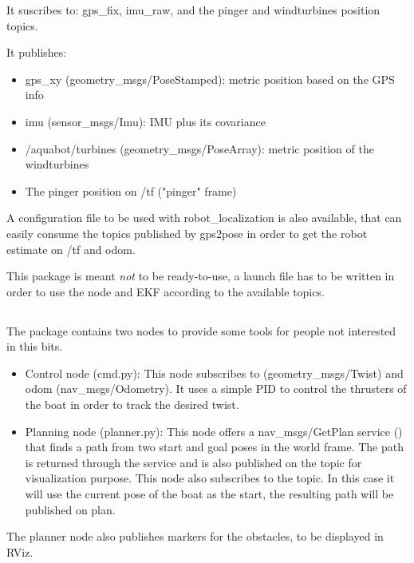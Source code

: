 \documentclass{ecnreport}
\begin{document}
It suscribes to: gps\_fix, imu\_raw, and the pinger and windturbines position topics.

It publishes:
\begin{itemize}
 \item gps\_xy (geometry\_msgs/PoseStamped): metric position based on the GPS info
\item imu (sensor\_msgs/Imu): IMU plus its covariance
\item /aquabot/turbines (geometry\_msgs/PoseArray): metric position of the windturbines
\item The pinger position on /tf ("pinger" frame)
\end{itemize}


A configuration file to be used with robot\_localization is also available, that can easily consume the topics published by gps2pose in order to get the robot estimate on /tf and odom.

This package is meant \emph{not} to be ready-to-use, a launch file has to be written in order to use the node and EKF according to the available topics.

\subsection{}

The  package contains two nodes to provide some tools for people not interested in this bits.

\begin{itemize}
 \item Control node (cmd.py): This node subscribes to  (geometry\_msgs/Twist) and odom (nav\_msgs/Odometry). It uses a simple PID to control the thrusters of the boat in order to track the desired twist.
 \item Planning node (planner.py): This node offers a nav\_msgs/GetPlan service () that finds a path from two start and goal poses in the world
frame. The path is returned through the service and is also published on the  topic for visualization purpose. This node also subscribes
to the  topic. In this case it will use the current pose of the boat as the start, the resulting path will be published on plan.
\end{itemize}

The planner node also publishes markers for the obstacles, to be displayed in RViz.
\end{document}
